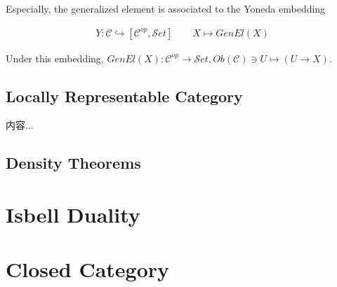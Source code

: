 \documentclass[Total.tex]{subfiles}
\begin{document}
		Especially, the generalized element is associated to the Yoneda embedding
		
		\begin{gather*}
			Y:\mathcal{C}\hookrightarrow [\mathcal{C}^{op},{\mathcal Set}]\qquad X\mapsto GenEl(X)
		\end{gather*}
		
		Under this embedding, $GenEl(X):\mathcal{C}^{op}\rightarrow {\mathcal Set}, Ob(\mathcal{C})\ni U\mapsto (U\rightarrow X)$. 
		
		\subsection{Locally Representable Category}
		\begin{Def}
			内容...
		\end{Def}
		\subsection{Density Theorems}
		\section{Isbell Duality}
		\section{Closed Category}
\end{document}

